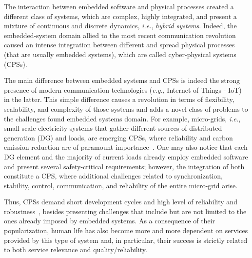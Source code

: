 \documentclass{acm_sen_article}
\begin{document}
The interaction between embedded software and physical processes created a different class of systems, which are complex, highly integrated, and present a mixture of continuous and discrete dynamics, {\it i.e.}, \textit{hybrid systems}. Indeed, the embedded-system domain allied to the most recent communication revolution caused an intense integration between different and spread physical processes (that are usually embedded systems), which are called cyber-physical systems (CPSs). 

The main difference between embedded systems and CPSs is indeed the strong presence of modern communication technologies ({\it e.g.}, Internet of Things - IoT) in the latter. This simple difference causes a revolution in terms of flexibility, scalability, and complexity of those systems and adds a novel class of problems to the challenges found embedded systems domain. For example, micro-grids, {\it i.e.}, small-scale electricity systems that gather different sources of distributed generation (DG) and loads, are emerging CPSs, where reliability and carbon emission reduction are of paramount importance~\cite{xu15}. One may also notice that each DG element and the majority of current loads already employ embedded software and present several safety-critical requirements; however, the integration of both constitute a CPS, where additional challenges related to synchronization, stability, control, communication, and reliability of the entire micro-grid arise.

Thus, CPSs demand short development cycles and high level of reliability and robustness~\cite{leeCPS,leeCPS2}, besides presenting challenges that include but are not limited to the ones already imposed by embedded systems. As a consequence of their popularization, human life has also become more and more dependent on services provided by this type of system and, in particular, their success is strictly related to both service relevance and quality/reliability. 
\end{document}
